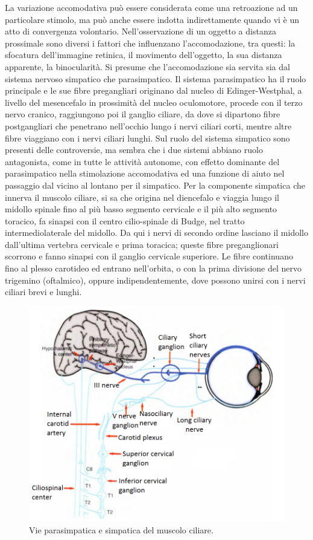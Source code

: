 La variazione accomodativa può essere considerata come una retroazione ad un particolare stimolo, ma può anche essere indotta indirettamente quando vi è un atto di convergenza volontario. Nell’osservazione di un oggetto a distanza prossimale sono diversi i fattori che influenzano l’accomodazione, tra questi: la sfocatura dell’immagine retinica, il movimento dell’oggetto, la sua distanza apparente, la binocularità. Si presume che l’accomodazione sia servita sia dal sistema nervoso simpatico che parasimpatico. Il sistema parasimpatico ha il ruolo principale e le sue fibre pregangliari originano dal nucleo di Edinger-Westphal, a livello del mesencefalo in prossimità del nucleo oculomotore, procede con il terzo nervo cranico, raggiungono poi il ganglio ciliare, da dove si dipartono fibre postgangliari che penetrano nell’occhio lungo i nervi ciliari corti, mentre altre fibre viaggiano con i nervi ciliari lunghi. Sul ruolo del sistema simpatico sono presenti delle controversie, ma sembra che i due sistemi abbiano ruolo antagonista, come in tutte le attività autonome, con effetto dominante del parasimpatico nella stimolazione accomodativa ed una funzione di aiuto nel passaggio dal vicino al lontano per il simpatico. Per la componente simpatica che innerva il muscolo ciliare, si sa che origina nel diencefalo e viaggia lungo il midollo spinale fino al più basso segmento cervicale e il più alto segmento toracico, fa sinapsi con il centro cilio-spinale di Budge, nel tratto intermediolaterale del midollo. Da qui i nervi di secondo ordine lasciano il midollo dall’ultima vertebra cervicale e prima toracica; queste fibre preganglionari scorrono e fanno sinapsi con il ganglio cervicale superiore. Le fibre continuano fino al plesso carotideo ed entrano nell’orbita, o con la prima divisione del nervo trigemino (oftalmico), oppure indipendentemente, dove possono unirsi con i nervi ciliari brevi e lunghi.

\begin{figure}[h!]
	\centering
	\includegraphics[scale=0.70]{source/immagini/accomodazione.png}
	\caption[Vie parasimpatica e simpatica del muscolo ciliare]{Vie parasimpatica e simpatica del muscolo ciliare.}
	\label{fig:test12}
\end{figure}

